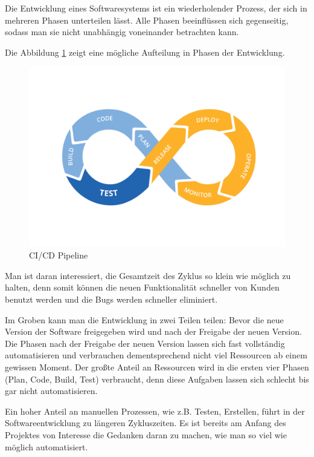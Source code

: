 Die Entwicklung eines Softwaresystems ist ein wiederholender Prozess, der sich in mehreren Phasen unterteilen lässt.
Alle Phasen beeinflüssen sich gegenseitig, sodass man sie nicht unabhängig voneinander betrachten kann. 

Die Abbildung \ref{fig:workflowCiCd} zeigt eine mögliche Aufteilung in Phasen der Entwicklung. 
\begin{figure}[H]
    \centering
    \includegraphics[width=1\textwidth]{../images/CiCD.png}
    \caption[CI/CD Pipeline]{CI/CD Pipeline \footnotemark}
    \label{fig:workflowCiCd}
\end{figure}

Man ist daran interessiert, die Gesamtzeit des Zyklus so klein wie möglich zu halten, denn somit können die neuen Funktionalität schneller von Kunden benutzt werden und 
die Bugs werden schneller eliminiert. 

Im Groben kann man die Entwicklung in zwei Teilen teilen: Bevor die neue Version der Software freigegeben 
wird und nach der Freigabe der neuen Version.
Die Phasen nach der Freigabe der neuen Version lassen sich fast vollständig automatisieren 
und verbrauchen dementsprechend nicht viel Ressourcen ab einem gewissen Moment. 
Der großte Anteil an Ressourcen wird in die ersten vier Phasen (Plan, Code, Build, Test) verbraucht, 
denn diese Aufgaben lassen sich schlecht bis gar nicht automatisieren. 

Ein hoher Anteil an manuellen Prozessen, wie z.B. Testen, Erstellen, führt in der Softwareentwicklung 
zu längeren Zykluszeiten. Es ist bereits am Anfang des Projektes von Interesse die Gedanken daran zu machen,
wie man so viel wie möglich automatisiert.

